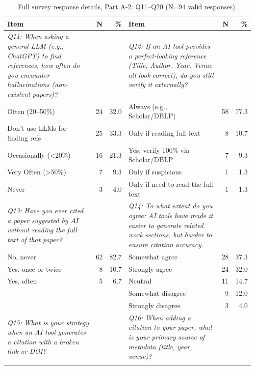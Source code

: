 \begin{table}[htbp]
  \centering
  \begin{threeparttable}
    \caption{Full survey response details, Part A-2: Q11--Q20 (N=94 valid responses).}
    \label{tab:survey_details_full_a2}
    \small
    \begin{tabular}{p{6cm}rr|p{6cm}rr}
\toprule
\textbf{Item} & \textbf{N} & \textbf{\%} & \textbf{Item} & \textbf{N} & \textbf{\%} \\
\midrule
\textit{Q11: When asking a general LLM (e.g., ChatGPT) to find references, how often do you encounter hallucinations (non-existent papers)?} & & & \textit{Q12: If an AI tool provides a perfect-looking reference (Title, Author, Year, Venue all look correct), do you still verify it externally?} & & \\
\rowcolor{tableRowLight}
Often (20--50\%) & 24 & 32.0 & Always (e.g., Scholar/DBLP) & 58 & 77.3 \\
Don't use LLMs for finding refs & 25 & 33.3 & Only if reading full text & 8 & 10.7 \\
\rowcolor{tableRowLight}
Occasionally (<20\%) & 16 & 21.3 & Yes, verify 100\% via Scholar/DBLP & 7 & 9.3 \\
Very Often (>50\%) & 7 & 9.3 & Only if suspicious & 1 & 1.3 \\
\rowcolor{tableRowLight}
Never & 3 & 4.0 & Only if need to read the full text & 1 & 1.3 \\
\midrule
\textit{Q13: Have you ever cited a paper suggested by AI without reading the full text of that paper?} & & & \textit{Q14: To what extent do you agree: AI tools have made it easier to generate related work sections, but harder to ensure citation accuracy.} & & \\
\rowcolor{tableRowLight}
No, never & 62 & 82.7 & Somewhat agree & 28 & 37.3 \\
Yes, once or twice & 8 & 10.7 & Strongly agree & 24 & 32.0 \\
\rowcolor{tableRowLight}
Yes, often & 5 & 6.7 & Neutral & 11 & 14.7 \\
 &  &  & Somewhat disagree & 9 & 12.0 \\
\rowcolor{tableRowLight}
 &  &  & Strongly disagree & 3 & 4.0 \\
\midrule
\textit{Q15: What is your strategy when an AI tool generates a citation with a broken link or DOI?} & & & \textit{Q16: When adding a citation to your paper, what is your primary source of metadata (title, year, venue)?} & & \\
\rowcolor{tableRowLight}

\end{tabular}
\end{threeparttable}
\end{table}
